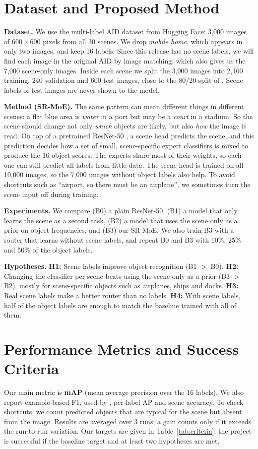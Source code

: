 \documentclass[9pt, conference, a4paper]{IEEEtran}
\begin{document}
\section{Dataset and Proposed Method}
\textbf{Dataset.} We use the multi-label AID dataset \cite{hua2020relation} from Hugging Face: 3,000 images of $600 \times 600$ pixels from all 30 scenes. We drop \textit{mobile home}, which appears in only two images, and keep 16 labels. Since this release has no scene labels, we will find each image in the original AID by image matching, which also gives us the 7,000 scene-only images. Inside each scene we split the 3,000 images into 2,160 training, 240 validation and 600 test images, close to the 80/20 split of \cite{hua2020relation}. Scene labels of test images are never shown to the model.

\textbf{Method (SR-MoE).} The same pattern can mean different things in different scenes: a flat blue area is \textit{water} in a port but may be a \textit{court} in a stadium. So the scene should change not only \emph{which} objects are likely, but also \emph{how} the image is read. On top of a pretrained ResNet-50 \cite{he2016resnet}, a scene head predicts the scene, and this prediction decides how a set of small, scene-specific expert classifiers is mixed to produce the 16 object scores. The experts share most of their weights, so each one can still predict all labels from little data. The scene head is trained on all 10,000 images, so the 7,000 images without object labels also help. To avoid shortcuts such as ``airport, so there must be an airplane'', we sometimes turn the scene input off during training.

\textbf{Experiments.} We compare (B0) a plain ResNet-50, (B1) a model that only learns the scene as a second task, (B2) a model that uses the scene only as a prior on object frequencies, and (B3) our SR-MoE. We also train B3 with a router that learns without scene labels, and repeat B0 and B3 with 10\%, 25\% and 50\% of the object labels.

\textbf{Hypotheses.} \textbf{H1:} Scene labels improve object recognition (B1 $>$ B0). \textbf{H2:} Changing the classifier per scene beats using the scene only as a prior (B3 $>$ B2), mostly for scene-specific objects such as airplanes, ships and docks. \textbf{H3:} Real scene labels make a better router than no labels. \textbf{H4:} With scene labels, half of the object labels are enough to match the baseline trained with all of them.

\section{Performance Metrics and Success Criteria}
Our main metric is \textbf{mAP} (mean average precision over the 16 labels). We also report example-based F1, used by \cite{hua2020relation}, per-label AP and scene accuracy. To check shortcuts, we count predicted objects that are typical for the scene but absent from the image. Results are averaged over 3 runs; a gain counts only if it exceeds the run-to-run variation. Our targets are given in Table~\ref{tab:criteria}; the project is successful if the baseline target and at least two hypotheses are met.
\end{document}
